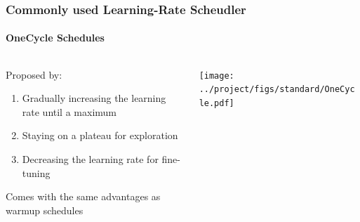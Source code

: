 \documentclass[10pt,aspectratio=169]{beamer}
\begin{document}
    \begin{frame}
        \frametitle{Commonly used Learning-Rate Scheudler}
        \framesubtitle{OneCycle Schedules}

        \begin{columns}
            \begin{column}{0.5\textwidth}
                Proposed by: \cite{smith2019super}
                \begin{enumerate}
                    \item Gradually increasing the learning rate until a maximum 
                    \item Staying on a plateau for exploration
                    \item Decreasing the learning rate for fine-tuning
                \end{enumerate}
                \vspace{0.5cm}
                
                Comes with the same advantages as warmup schedules
            \end{column}
            \begin{column}{0.5\textwidth}
                \texttt{[image: ../project/figs/standard/OneCycle.pdf]}
            \end{column}
        \end{columns}    
    \end{frame}
\end{document}
